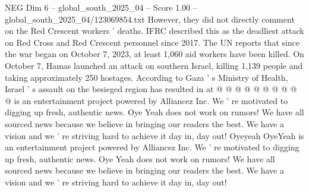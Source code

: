 \begin{textsample}{NEG Dim 6 – global\_south\_2025\_04 – Score 1.00 – global\_south\_2025\_04/123069854.txt}
However, they did not directly comment on the Red Crescent workers ' deaths.
IFRC described this as the deadliest attack on Red Cross and Red Crescent personnel since 2017.
The UN reports that since the war began on October 7, 2023, at least 1,060 aid workers have been killed.
On October 7, Hamas launched an attack on southern Israel, killing 1,139 people and taking approximately 250 hostages.
According to Gaza ' s Ministry of Health, Israel ' s assault on the besieged region has resulted in at @ @ @ @ @ @ @ @ @ @ is an entertainment project powered by Alliancez Inc.
We ' re motivated to digging up fresh, authentic news.
Oye Yeah does not work on rumors!
We have all sourced news because we believe in bringing our readers the best.
We have a vision and we ' re striving hard to achieve it day in, day out!
Oyeyeah OyeYeah is an entertainment project powered by Alliancez Inc.
We ' re motivated to digging up fresh, authentic news.
Oye Yeah does not work on rumors!
We have all sourced news because we believe in bringing our readers the best.
We have a vision and we ' re striving hard to achieve it day in, day out!

\end{textsample}
